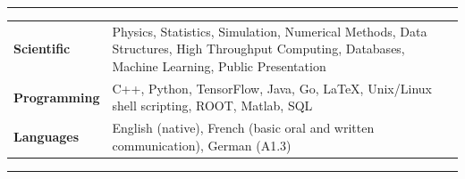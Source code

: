 \documentclass{letter}
\begin{document}

\begin{flushleft}
  \Large{\textsc{\textbf{\color{Maroon}{Skills}}}}
  \vspace{1pt}  %
  \hrule
\end{flushleft}

\begin{tabular}{p{}p{}}

  {\bf Scientific} 
  &
  Physics, Statistics, Simulation, Numerical Methods, Data Structures, High Throughput Computing, Databases, Machine Learning, Public Presentation \newline
  \\

  {\bf Programming} 
  &
  C++, Python, TensorFlow, Java, Go, \LaTeX{}, Unix/Linux shell scripting, ROOT, Matlab, SQL \newline
  \\ 

  {\bf Languages}
  &
  English (native), French (basic oral and written communication), German (A1.3)
\end{tabular}



\begin{flushleft}
  \Large{\textsc{\textbf{\color{Maroon}{Volunteering \& Outreach}}}}
  \vspace{1pt}  %
  \hrule
\end{flushleft}
\vspace{-10pt}  %
\end{document}
